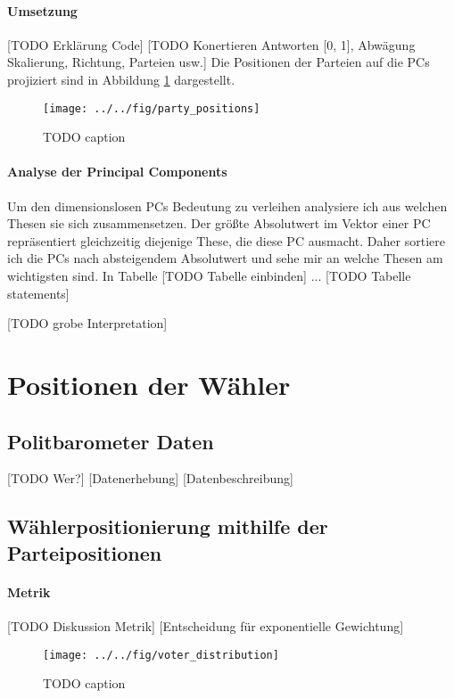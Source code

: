 \paragraph{Umsetzung}
[TODO Erklärung Code]
[TODO Konertieren Antworten [0, 1], Abwägung Skalierung, Richtung, Parteien usw.]
Die Positionen der Parteien auf die PCs projiziert sind in Abbildung \ref{fig:party-positions-pca} dargestellt.

\begin{figure}[htb]
	\centering
	\texttt{[image: ../../fig/party\_positions]}
	\caption{TODO caption}
	\label{fig:party-positions-pca}
\end{figure}

\paragraph{Analyse der Principal Components}
Um den dimensionslosen PCs Bedeutung zu verleihen analysiere ich aus welchen Thesen sie sich zusammensetzen. Der größte Absolutwert im Vektor einer PC repräsentiert gleichzeitig diejenige These, die diese PC ausmacht. Daher sortiere ich die PCs nach absteigendem Absolutwert und sehe mir an welche Thesen am wichtigsten sind. In Tabelle [TODO Tabelle einbinden] ...
[TODO Tabelle statements]

[TODO grobe Interpretation]

\section{Positionen der Wähler}\label{Sec-Wählerpositionen}

\subsection{Politbarometer Daten}
[TODO Wer?]
[Datenerhebung]
[Datenbeschreibung]

\subsection{Wählerpositionierung mithilfe der Parteipositionen}
\paragraph{Metrik}
[TODO Diskussion Metrik]
[Entscheidung für exponentielle Gewichtung]
\begin{figure}[htb]
	\centering
	\texttt{[image: ../../fig/voter\_distribution]}
	\caption{TODO caption}
	\label{fig:voter-positions-pca}
\end{figure}

